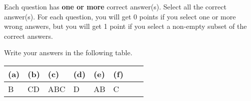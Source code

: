 
Each question has \textbf{one or more} correct answer(s). Select all the correct answer(s). For each question, you will get 0 points if you select one or more wrong answers, but you will get 1 point if you select a non-empty subset of the correct answers.

Write your answers in the following table.


\begin{table}[htbp]
	\centering
	\begin{tabular}{|p{1.7cm}|p{1.7cm}|p{1.7cm}|p{1.7cm}|p{1.7cm}|p{1.7cm}|p{1.7cm}|p{1.7cm}|}
		\hline
		(a) & (b) & (c) & (d) & (e) & (f) \\
		\hline
		 B   &  CD   &  ABC   &  D   &  AB   &  C   \\
		\hline
	\end{tabular}
\end{table}

